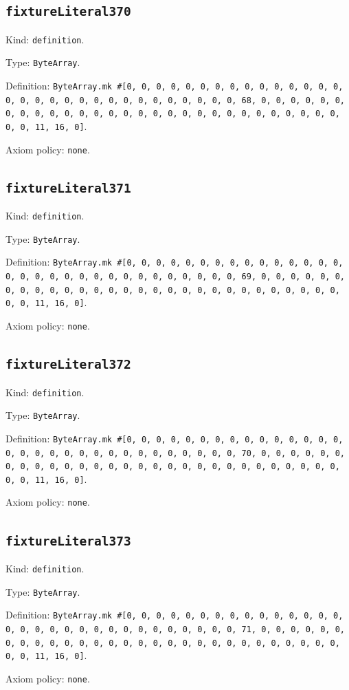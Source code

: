 \documentclass[11pt]{article}
\begin{document}
\subsection*{\texttt{fixtureLiteral370}}
\noindent Kind: \texttt{definition}.\par
\noindent Type: \texttt{ByteArray}.\par
\noindent Definition: \texttt{ByteArray.mk \#[0, 0, 0, 0, 0, 0, 0, 0, 0, 0, 0, 0, 0, 0, 0, 0, 0, 0, 0, 0, 0, 0, 0, 0, 0, 0, 0, 0, 0, 0, 0, 68, 0, 0, 0, 0, 0, 0, 0, 0, 0, 0, 0, 0, 0, 0, 0, 0, 0, 0, 0, 0, 0, 0, 0, 0, 0, 0, 0, 0, 0, 0, 0, 11, 16, 0]}.\par
\noindent Axiom policy: \texttt{none}.\par
\subsection*{\texttt{fixtureLiteral371}}
\noindent Kind: \texttt{definition}.\par
\noindent Type: \texttt{ByteArray}.\par
\noindent Definition: \texttt{ByteArray.mk \#[0, 0, 0, 0, 0, 0, 0, 0, 0, 0, 0, 0, 0, 0, 0, 0, 0, 0, 0, 0, 0, 0, 0, 0, 0, 0, 0, 0, 0, 0, 0, 69, 0, 0, 0, 0, 0, 0, 0, 0, 0, 0, 0, 0, 0, 0, 0, 0, 0, 0, 0, 0, 0, 0, 0, 0, 0, 0, 0, 0, 0, 0, 0, 11, 16, 0]}.\par
\noindent Axiom policy: \texttt{none}.\par
\subsection*{\texttt{fixtureLiteral372}}
\noindent Kind: \texttt{definition}.\par
\noindent Type: \texttt{ByteArray}.\par
\noindent Definition: \texttt{ByteArray.mk \#[0, 0, 0, 0, 0, 0, 0, 0, 0, 0, 0, 0, 0, 0, 0, 0, 0, 0, 0, 0, 0, 0, 0, 0, 0, 0, 0, 0, 0, 0, 0, 70, 0, 0, 0, 0, 0, 0, 0, 0, 0, 0, 0, 0, 0, 0, 0, 0, 0, 0, 0, 0, 0, 0, 0, 0, 0, 0, 0, 0, 0, 0, 0, 11, 16, 0]}.\par
\noindent Axiom policy: \texttt{none}.\par
\subsection*{\texttt{fixtureLiteral373}}
\noindent Kind: \texttt{definition}.\par
\noindent Type: \texttt{ByteArray}.\par
\noindent Definition: \texttt{ByteArray.mk \#[0, 0, 0, 0, 0, 0, 0, 0, 0, 0, 0, 0, 0, 0, 0, 0, 0, 0, 0, 0, 0, 0, 0, 0, 0, 0, 0, 0, 0, 0, 0, 71, 0, 0, 0, 0, 0, 0, 0, 0, 0, 0, 0, 0, 0, 0, 0, 0, 0, 0, 0, 0, 0, 0, 0, 0, 0, 0, 0, 0, 0, 0, 0, 11, 16, 0]}.\par
\noindent Axiom policy: \texttt{none}.\par
\end{document}
